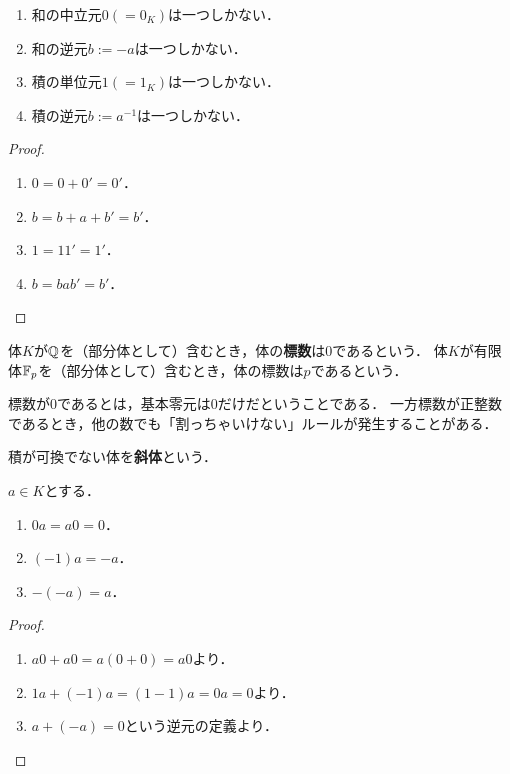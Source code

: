 \documentclass[uplatex, 12pt, dvipdfmx]{jsreport}
\begin{document}
\begin{lemma}\mbox{}
    \begin{enumerate}
        \item 和の中立元$0(=0_K)$は一つしかない．
        \item 和の逆元$b:=-a$は一つしかない．
        \item 積の単位元$1(=1_K)$は一つしかない．
        \item 積の逆元$b:=a^{-1}$は一つしかない．
    \end{enumerate}
\end{lemma}
\begin{proof}
    \begin{enumerate}
        \item $0=0+0'=0'$．
        \item $b=b+a+b'=b'$．
        \item $1=11'=1'$．
        \item $b=bab'=b'$．
    \end{enumerate}
\end{proof}

\begin{definition}[characteristic]
    体$K$が$\mathbb{Q}$を（部分体として）含むとき，体の\textbf{標数}は$0$であるという．
    体$K$が有限体$\mathbb{F}_p$を（部分体として）含むとき，体の標数は$p$であるという．
\end{definition}
\begin{remark}
    標数が$0$であるとは，基本零元は$0$だけだということである．
    一方標数が正整数であるとき，他の数でも「割っちゃいけない」ルールが発生することがある．
\end{remark}

\begin{definition}
    積が可換でない体を\textbf{斜体}という．
\end{definition}

\begin{proposition}
    $a\in K$とする．
    \begin{enumerate}
        \item $0a=a0=0$．
        \item $(-1)a=-a$．
        \item $-(-a)=a$．
    \end{enumerate}
\end{proposition}
\begin{proof}
    \begin{enumerate}
        \item $a0+a0=a(0+0)=a0$より．
        \item $1a+(-1)a=(1-1)a=0a=0$より．
        \item $a+(-a)=0$という逆元の定義より．
    \end{enumerate}
\end{proof}
\end{document}
